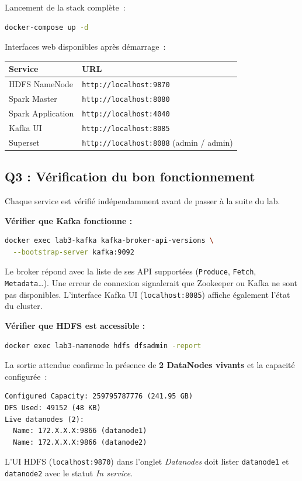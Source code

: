 \documentclass{RapportINPTCLOUD}
\begin{document}
Lancement de la stack compl\`{e}te~:
\begin{lstlisting}[style=code, language=bash]
docker-compose up -d
\end{lstlisting}

Interfaces web disponibles apr\`{e}s d\'{e}marrage~:
\begin{center}
\begin{tabular}{|l|l|}
\hline
\textbf{Service} & \textbf{URL} \\
\hline
HDFS NameNode & \texttt{http://localhost:9870} \\
Spark Master & \texttt{http://localhost:8080} \\
Spark Application & \texttt{http://localhost:4040} \\
Kafka UI & \texttt{http://localhost:8085} \\
Superset & \texttt{http://localhost:8088} (admin / admin) \\
\hline
\end{tabular}
\end{center}

\subsection{Q3 : V\'{e}rification du bon fonctionnement}

Chaque service est v\'{e}rifi\'{e} ind\'{e}pendamment avant de passer \`{a} la suite du lab.

\textbf{V\'{e}rifier que Kafka fonctionne :}
\begin{lstlisting}[style=code, language=bash]
docker exec lab3-kafka kafka-broker-api-versions \
  --bootstrap-server kafka:9092
\end{lstlisting}
Le broker r\'{e}pond avec la liste de ses API support\'{e}es (\texttt{Produce}, \texttt{Fetch}, \texttt{Metadata}\dots). Une erreur de connexion signalerait que Zookeeper ou Kafka ne sont pas disponibles. L'interface Kafka UI (\texttt{localhost:8085}) affiche \'{e}galement l'\'{e}tat du cluster.

\textbf{V\'{e}rifier que HDFS est accessible :}
\begin{lstlisting}[style=code, language=bash]
docker exec lab3-namenode hdfs dfsadmin -report
\end{lstlisting}
La sortie attendue confirme la pr\'{e}sence de \textbf{2 DataNodes vivants} et la capacit\'{e} configur\'{e}e~:
\begin{lstlisting}[style=code]
Configured Capacity: 259795787776 (241.95 GB)
DFS Used: 49152 (48 KB)
Live datanodes (2):
  Name: 172.X.X.X:9866 (datanode1)
  Name: 172.X.X.X:9866 (datanode2)
\end{lstlisting}
L'UI HDFS (\texttt{localhost:9870}) dans l'onglet \textit{Datanodes} doit lister \texttt{datanode1} et \texttt{datanode2} avec le statut \textit{In service}.
\end{document}
